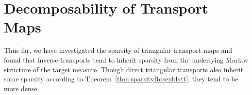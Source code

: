 \documentclass[twoside,11pt]{article}
\begin{document}
\section{Decomposability of Transport Maps}
\label{sec:decomp}
%
%

%
 
%
%

%

%

%
%
%
%
%
%

%
%
%
%

%
%
%
%
%

%


Thus far, we have investigated the sparsity of triangular transport maps and
found that inverse transports tend to inherit sparsity from the
underlying Markov structure of the target measure.  Though direct
triangular transports also inherit some sparsity according to
Theorem~\ref{thm:sparsityRosenblatt}, they tend to be more dense.
%
%
%
%
%
%
%
%
\end{document}
